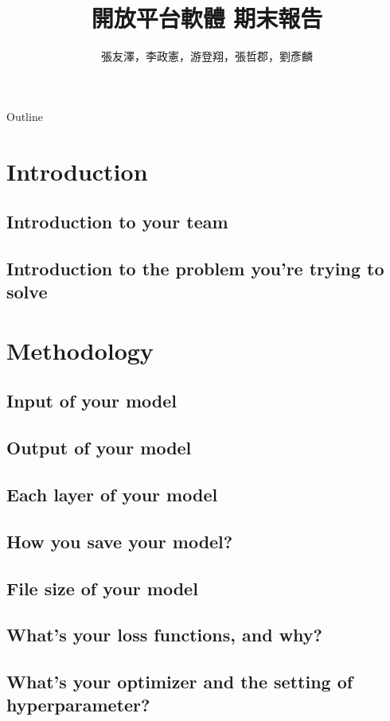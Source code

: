 \documentclass{beamer}
\begin{document}
\begin{CJK}{UTF8}{nkai}
\title{開放平台軟體 期末報告}
\author{張友澤，李政憲，游登翔，張哲郡，劉彥麟}

\begin{frame}
  \titlepage
\end{frame}

\begin{frame}[shrink]{Outline}
  \tableofcontents
\end{frame}


\section{ Introduction}
\subsection{Introduction to your team}
\subsection{Introduction to the problem you're trying to solve}

\section{Methodology}
\subsection{Input of your model}
\subsection{Output of your model}
\subsection{Each layer of your model}
\subsection{How you save your model?}
\subsection{File size of your model}
\subsection{What's your loss functions, and why?}
\subsection{What's your optimizer and the setting of hyperparameter?}


\end{CJK}
\end{document}
